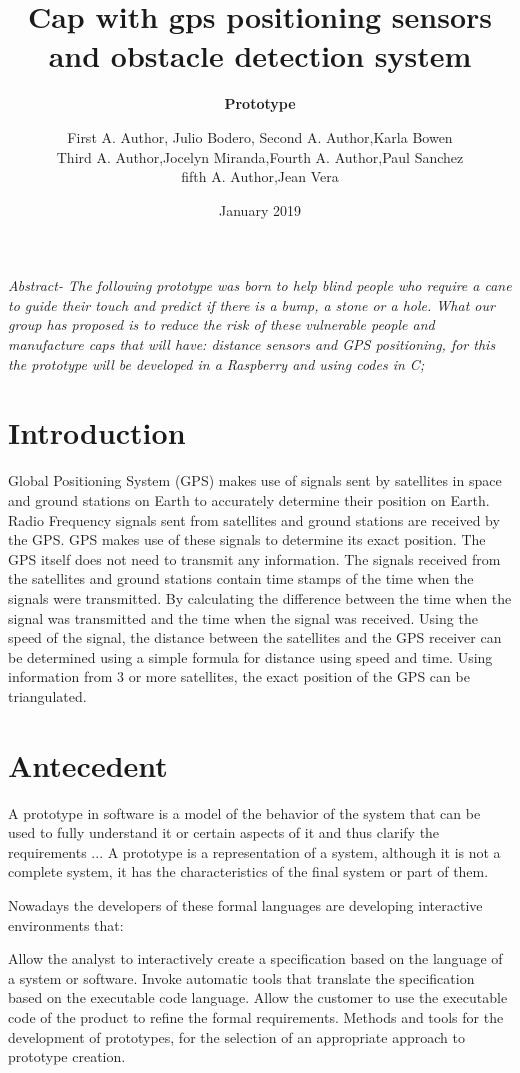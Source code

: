 \documentclass[11pt,a4paper,twocolumn]{article}
\title{Cap with gps positioning sensors and obstacle detection system}
\author{
\small{First A. Author, Julio Bodero, Second A. Author,Karla Bowen} \\
\small{Third A. Author,Jocelyn Miranda,Fourth A. Author,Paul Sanchez}\\
\small{fifth A. Author,Jean Vera}}
\date{January 2019}
\begin{document}
\maketitle

\textit{Abstract- 
The following prototype was born to help blind people  
who require a cane to guide their touch and predict 
if there is a bump, a stone or a hole. What our group 
has proposed is to reduce the risk of these vulnerable
people and manufacture caps that will have: distance sensors 
and GPS positioning, for this the prototype will 
be developed in a Raspberry and using codes in C;
}
\justify


\section{Introduction}

Global Positioning System (GPS) makes use of signals sent by satellites in space and ground stations on Earth to accurately determine their position on Earth.
Radio Frequency signals sent from satellites and ground stations are received by the GPS. GPS makes use of these signals to determine its exact position.
The GPS itself does not need to transmit any information.
The signals received from the satellites and ground stations contain time stamps of the time when the signals were transmitted. By calculating the difference between the time when the signal was transmitted and the time when the signal was received. Using the speed of the signal, the distance between the satellites and the GPS receiver can be determined using a simple formula for distance using speed and time.
Using information from 3 or more satellites, the exact position of the GPS can be triangulated.

\section{Antecedent}
\subtitle{\textbf{Prototype}}
A prototype in software is a model of the behavior of the system that can be used to fully understand it or certain aspects of it and thus clarify the requirements ... A prototype is a representation of a system, although it is not a complete system, it has the characteristics of the final system or part of them.

Nowadays the developers of these formal languages ​​are developing interactive environments that:

Allow the analyst to interactively create a specification based on the language of a system or software.
Invoke automatic tools that translate the specification based on the executable code language.
Allow the customer to use the executable code of the product to refine the formal requirements.
Methods and tools for the development of prototypes, for the selection of an appropriate approach to prototype creation.\\
\end{document}
